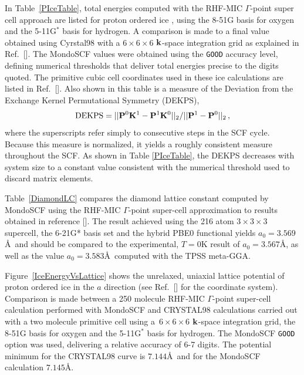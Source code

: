 \commentoutA{\documentclass[prb,aps,nobibnotes,twocolumn,doublespace,twocolumngrid,superbib,showpacs]{revtex4}}
\begin{document}
In Table~\ref{PIceTable}, total energies computed with the RHF-MIC $\Gamma$-point
super cell approach are listed for proton ordered ice \cite{SCasassa97}, using the 8-51G basis 
for oxygen and the 5-11G$^*$ basis for hydrogen.  A comparison is made to a final 
value obtained using {\sc Cyrstal98} with a $6\times6\times6$ ${\bf k}$-space integration grid
as explained in Ref.~[].  The {\sc MondoSCF} values were obtained 
using the {\tt GOOD} accuracy level, defining numerical thresholds that deliver total energies
precise to the digits quoted.
The primitive cubic cell coordinates used in these ice calculations are listed in Ref.~[].      
Also shown in this table is a measure of the 
Deviation from the Exchange Kernel Permutational Symmetry (DEKPS),
\begin{equation}
{\rm DEKPS} = || {\bf P}^0 {\bf K}^1-{\bf P}^1 {\bf K}^0 ||_2/|| {\bf P}^1 - {\bf P}^0||_2 \, ,
\end{equation}
where the superscripts refer simply to consecutive steps in the SCF cycle.  Because this measure
is normalized, it yields a roughly consistent measure throughout the SCF.  As shown in Table \ref{PIceTable},
the DEKPS decreases with system size to a constant value consistent with the numerical threshold used to 
discard matrix elements.   

Table~\ref{DiamondLC}  compares the diamond lattice constant computed by MondoSCF using the RHF-MIC 
$\Gamma$-point super-cell approximation to results obtained in reference [].  
The result achieved using the 216 atom $3 \times 3 \times 3$ 
supercell, the 6-21G* basis set and the hybrid PBE0 functional yields $a_0=3.569$\AA~and should be
compared to the experimental, $T=0$K result of $a_0=3.567$\AA, as well as 
the value $a_0=3.583$\AA~computed with the TPSS meta-GGA\cite{VStaroverov04}.

Figure~\ref{IceEnergyVsLattice} shows the unrelaxed, uniaxial lattice potential of 
proton ordered ice \cite{SCasassa97} in the $a$ direction (see Ref.~[] 
for the coordinate system).  Comparison is made between a 250 molecule RHF-MIC $\Gamma$-point 
super-cell calculation performed with {\sc MondoSCF} and {\sc CRYSTAL98} calculations carried 
out with a two molecule primitive cell using a~$6\times6\times6$ ${\bf k}$-space integration grid, 
the 8-51G basis for oxygen and the 5-11G${^*}$ basis for hydrogen.  The {\sc MondoSCF} {\tt GOOD} 
option was used, delivering a relative accuracy of 6-7 digits. The potential minimum for the 
{\sc CRYSTAL98} curve is $7.144$\AA~and  for the {\sc MondoSCF} calculation $7.145$\AA.
\end{document}
